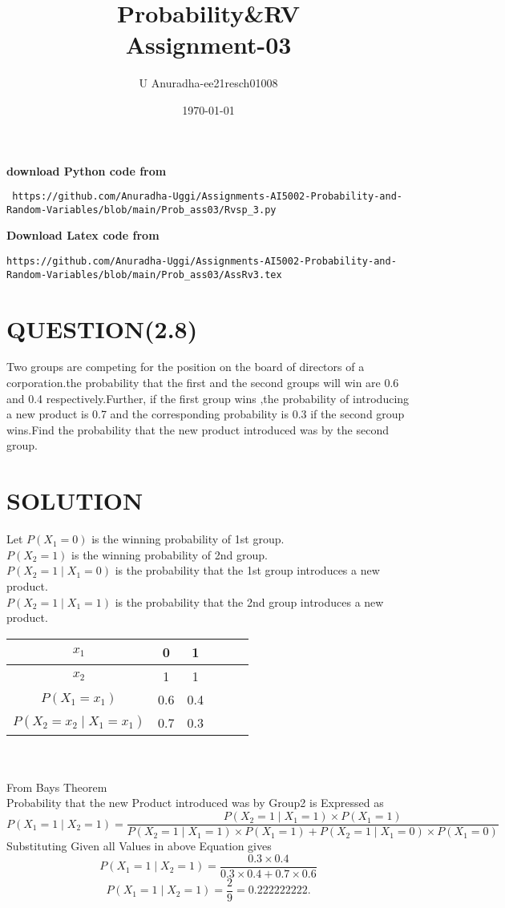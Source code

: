 \documentclass[journal,12pt,twocolumn]{IEEEtran}
\title{Probability\&RV \\ Assignment-03}
\author{U Anuradha-ee21resch01008}
\date{\today}
\begin{document}
\maketitle
\newpage
\bigskip
\renewcommand{\thefigure}{\theenumi}
\renewcommand{\thetable}{\theenumi}
\textbf{download Python code from}
\begin{lstlisting}
 https://github.com/Anuradha-Uggi/Assignments-AI5002-Probability-and-Random-Variables/blob/main/Prob_ass03/Rvsp_3.py
\end{lstlisting}
\textbf{Download Latex code from}
\begin{lstlisting}
https://github.com/Anuradha-Uggi/Assignments-AI5002-Probability-and-Random-Variables/blob/main/Prob_ass03/AssRv3.tex
\end{lstlisting}
\section{QUESTION(2.8)}
Two groups are competing for the position on the board of directors of a corporation.the probability that the first and the second groups will win are 0.6 and 0.4 respectively.Further, if the first group wins ,the probability of introducing a new product is 0.7 and the corresponding probability is 0.3 if the second group wins.Find the probability that the new product introduced was by the second group.
\section{SOLUTION}
Let $P(X_1=0)$ is the winning probability of 1st group.\\
    $P(X_2=1)$ is the winning probability of 2nd group.\\
    $P(X_2=1\mid X_1=0)$ is the probability that the 1st group introduces a new product.\\
    $P(X_2=1\mid X_1=1)$ is the probability that the 2nd group introduces a new product.\\ 
    
 \begin{tabular}{|c|c|c|c|c|c|}
\hline
   $x_1$  & 0 & 1 \\
\hline
   $x_2$ & 1 & 1 \\
\hline
 $ P(X_1=x_1)$ & 0.6 & 0.4 \\
\hline
 $P(X_2=x_2\mid X_1=x_1)$ & 0.7 & 0.3\\
\hline
\end{tabular}\\ \\
From Bays Theorem \\
Probability that the new Product introduced was by Group2 is Expressed as
\begin{equation*}
   P(X_1=1\mid X_2=1)=\frac{P(X_2=1\mid X_1=1)\times P(X_1=1)}{{P(X_2=1\mid X_1=1)\times P(X_1=1)}+{P(X_2=1\mid X_1=0)\times P(X_1=0)}}
\end{equation*}
Substituting Given all Values in above Equation gives
\begin{equation*}
    P(X_1=1\mid X_2=1)=\frac{0.3\times 0.4}{{0.3\times 0.4}+{0.7\times 0.6}}
\end{equation*}
\begin{equation*}
    P(X_1=1\mid X_2=1)=\frac{2}{9}=0.222222222.
\end{equation*}
\end{document}
